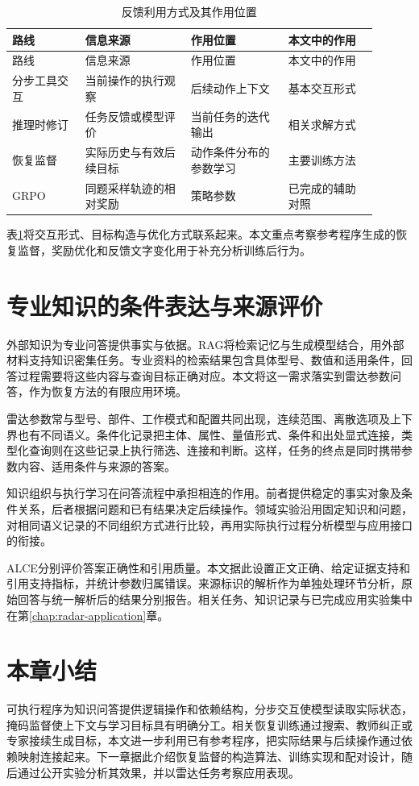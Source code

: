 \begin{longtable}{@{}p{0.18\linewidth}p{0.26\linewidth}p{0.24\linewidth}p{0.22\linewidth}@{}}
\caption{反馈利用方式及其作用位置}\label{tab:background-methods}\\
\toprule
路线 & 信息来源 & 作用位置 & 本文中的作用\\
\midrule
\endfirsthead
\toprule
路线 & 信息来源 & 作用位置 & 本文中的作用\\
\midrule
\endhead
分步工具交互 & 当前操作的执行观察 & 后续动作上下文 & 基本交互形式\\
推理时修订 & 任务反馈或模型评价 & 当前任务的迭代输出 & 相关求解方式\\
恢复监督 & 实际历史与有效后续目标 & 动作条件分布的参数学习 & 主要训练方法\\
GRPO & 同题采样轨迹的相对奖励 & 策略参数 & 已完成的辅助对照\\
\bottomrule
\end{longtable}

表\ref{tab:background-methods}将交互形式、目标构造与优化方式联系起来。本文重点考察参考程序生成的恢复监督，奖励优化和反馈文字变化用于补充分析训练后行为。

\section{专业知识的条件表达与来源评价}

外部知识为专业问答提供事实与依据。RAG将检索记忆与生成模型结合，用外部材料支持知识密集任务\cite{lewis2020rag}。专业资料的检索结果包含具体型号、数值和适用条件，回答过程需要将这些内容与查询目标正确对应。本文将这一需求落实到雷达参数问答，作为恢复方法的有限应用环境。

雷达参数常与型号、部件、工作模式和配置共同出现，连续范围、离散选项及上下界也有不同语义。条件化记录把主体、属性、量值形式、条件和出处显式连接，类型化查询则在这些记录上执行筛选、连接和判断。这样，任务的终点是同时携带参数内容、适用条件与来源的答案。

知识组织与执行学习在问答流程中承担相连的作用。前者提供稳定的事实对象及条件关系，后者根据问题和已有结果决定后续操作。领域实验沿用固定知识和问题，对相同语义记录的不同组织方式进行比较，再用实际执行过程分析模型与应用接口的衔接。

ALCE分别评价答案正确性和引用质量\cite{gao2023alce}。本文据此设置正文正确、给定证据支持和引用支持指标，并统计参数归属错误。来源标识的解析作为单独处理环节分析，原始回答与统一解析后的结果分别报告。相关任务、知识记录与已完成应用实验集中在第\ref{chap:radar-application}章。

\section{本章小结}

可执行程序为知识问答提供逻辑操作和依赖结构，分步交互使模型读取实际状态，掩码监督使上下文与学习目标具有明确分工。相关恢复训练通过搜索、教师纠正或专家接续生成目标，本文进一步利用已有参考程序，把实际结果与后续操作通过依赖映射连接起来。下一章据此介绍恢复监督的构造算法、训练实现和配对设计，随后通过公开实验分析其效果，并以雷达任务考察应用表现。
